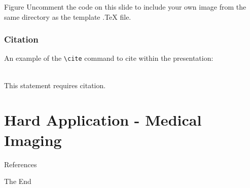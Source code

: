 \documentclass[aspectratio=169,xcolor=dvipsnames]{beamer}
\begin{document}
	
	\begin{frame}{Figure}
		Uncomment the code on this slide to include your own image from the same directory as the template .TeX file.
	\end{frame}
	
	
	\begin{frame}[fragile] %
		\frametitle{Citation}
		An example of the \verb|\cite| command to cite within the presentation:\\~
		
		This statement requires citation.
	\end{frame}
	
	\section{Hard Application - Medical Imaging}
	
	\begin{frame}{References}
		\printbibliography
	\end{frame}
	
	
	\begin{frame}
		\Huge{\centerline{The End}}
	\end{frame}
	
	
\end{document}
